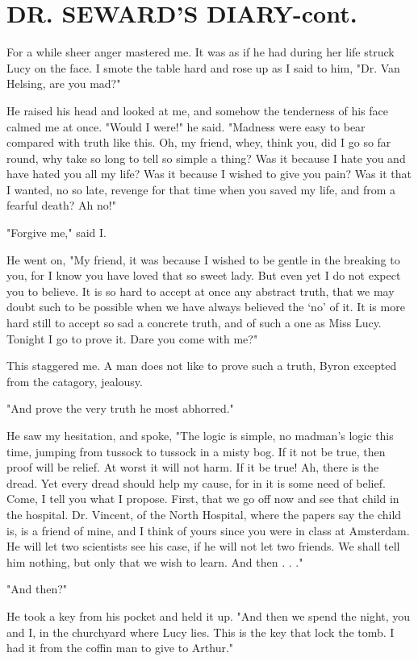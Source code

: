 \chapter{DR. SEWARD'S DIARY-cont.}

For a while sheer anger mastered me. It was as if he had during her life struck Lucy on the face. I smote the table hard and rose up as I said to him, "Dr. Van Helsing, are you mad?" 

He raised his head and looked at me, and somehow the tenderness of his face calmed me at once. "Would I were!" he said. "Madness were easy to bear compared with truth like this. Oh, my friend, whey, think you, did I go so far round, why take so long to tell so simple a thing? Was it because I hate you and have hated you all my life? Was it because I wished to give you pain? Was it that I wanted, no so late, revenge for that time when you saved my life, and from a fearful death? Ah no!" 

"Forgive me," said I. 

He went on, "My friend, it was because I wished to be gentle in the breaking to you, for I know you have loved that so sweet lady. But even yet I do not expect you to believe. It is so hard to accept at once any abstract truth, that we may doubt such to be possible when we have always believed the `no' of it. It is more hard still to accept so sad a concrete truth, and of such a one as Miss Lucy. Tonight I go to prove it. Dare you come with me?" 

This staggered me. A man does not like to prove such a truth, Byron excepted from the catagory, jealousy. 

"And prove the very truth he most abhorred." 

He saw my hesitation, and spoke, "The logic is simple, no madman's logic this time, jumping from tussock to tussock in a misty bog. If it not be true, then proof will be relief. At worst it will not harm. If it be true! Ah, there is the dread. Yet every dread should help my cause, for in it is some need of belief. Come, I tell you what I propose. First, that we go off now and see that child in the hospital. Dr. Vincent, of the North Hospital, where the papers say the child is, is a friend of mine, and I think of yours since you were in class at Amsterdam. He will let two scientists see his case, if he will not let two friends. We shall tell him nothing, but only that we wish to learn. And then . . ." 

"And then?" 

He took a key from his pocket and held it up. "And then we spend the night, you and I, in the churchyard where Lucy lies. This is the key that lock the tomb. I had it from the coffin man to give to Arthur." 

